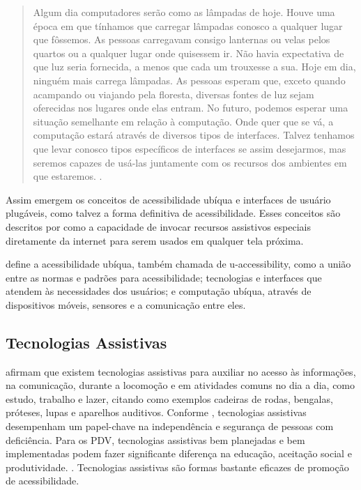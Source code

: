 \documentclass[twoside,english,brazilian]{UNISINOSartigo}
\begin{document}
\begin{quote}
	Algum dia computadores serão como as lâmpadas de hoje. Houve uma época em que tínhamos que carregar lâmpadas conosco a qualquer lugar que fôssemos. As pessoas carregavam consigo lanternas ou velas pelos quartos ou a qualquer lugar onde quisessem ir. Não havia expectativa de que luz seria fornecida, a menos que cada um trouxesse a sua. Hoje em dia, ninguém mais carrega lâmpadas. As pessoas esperam que, exceto quando acampando ou viajando pela floresta, diversas fontes de luz sejam oferecidas nos lugares onde elas entram. No futuro, podemos esperar uma situação semelhante em relação à computação. Onde quer que se vá, a computação estará através de diversos tipos de interfaces. Talvez tenhamos que levar conosco tipos específicos de interfaces se assim desejarmos, mas seremos capazes de usá-las juntamente com os recursos dos ambientes em que estaremos. \cite{vanderheiden2008ubiquitous}.
\end{quote}

Assim emergem os conceitos de acessibilidade ubíqua e interfaces de usuário plugáveis, como talvez a forma definitiva de acessibilidade. Esses conceitos são descritos por  como a capacidade de invocar recursos assistivos especiais diretamente da internet para serem usados em qualquer tela próxima.

 define a acessibilidade ubíqua, também chamada de u-accessibility, como a união entre as normas e padrões para acessibilidade; tecnologias e interfaces que atendem às necessidades dos usuários; e computação ubíqua, através de dispositivos móveis, sensores e a comunicação entre eles.

\subsection{Tecnologias Assistivas}
 afirmam que existem tecnologias assistivas para auxiliar no acesso às informações, na comunicação, durante a locomoção e em atividades comuns no dia a dia, como estudo, trabalho e lazer, citando como exemplos cadeiras de rodas, bengalas, próteses, lupas e aparelhos auditivos. Conforme , tecnologias assistivas desempenham um papel-chave na independência e segurança de pessoas com deficiência. Para os PDV, tecnologias assistivas bem planejadas e bem implementadas podem fazer significante diferença na educação, aceitação social e produtividade. \cite{dias2015navpal}. Tecnologias assistivas são formas bastante eficazes de promoção de acessibilidade.
\end{document}

